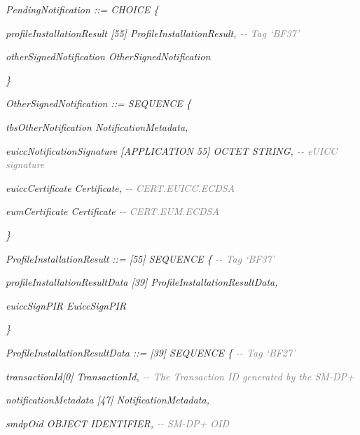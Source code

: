 \documentclass[10pt, oneside]{book}
\begin{document}
\textit{PendingNotification ::= CHOICE \{}

\hspace{0.75cm} \textit{profileInstallationResult [55] ProfileInstallationResult, \textcolor{gray}{{-}{-} Tag `BF37'}}

\hspace{0.75cm} \textit{otherSignedNotification OtherSignedNotification}

\textit{\}\\}

\textit{OtherSignedNotification ::= SEQUENCE \{}

\hspace{0.75cm} \textit{tbsOtherNotification NotificationMetadata,}

\hspace{0.75cm} \textit{euiccNotificationSignature [APPLICATION 55] OCTET STRING, \textcolor{gray}{{-}{-} eUICC signature}}

\hspace{0.75cm} \textit{euiccCertificate Certificate, \textcolor{gray}{{-}{-} CERT.EUICC.ECDSA}}

\hspace{0.75cm} \textit{eumCertificate Certificate \textcolor{gray}{{-}{-} CERT.EUM.ECDSA}}

\textit{\}\\}

\textit{ProfileInstallationResult ::= [55] SEQUENCE \{ \textcolor{gray}{{-}{-} Tag `BF37'}}

\hspace{0.75cm} \textit{profileInstallationResultData [39] ProfileInstallationResultData,}

\hspace{0.75cm} \textit{euiccSignPIR EuiccSignPIR}

\textit{\}\\}

\textit{ProfileInstallationResultData ::= [39] SEQUENCE \{ \textcolor{gray}{{-}{-} Tag `BF27'}}

\hspace{0.75cm} \textit{transactionId[0] TransactionId, \textcolor{gray}{{-}{-} The Transaction ID generated by the SM-DP+}}

\hspace{0.75cm} \textit{notificationMetadata [47] NotificationMetadata,}

\hspace{0.75cm} \textit{smdpOid OBJECT IDENTIFIER, \textcolor{gray}{{-}{-} SM-DP+ OID}}
\end{document}
